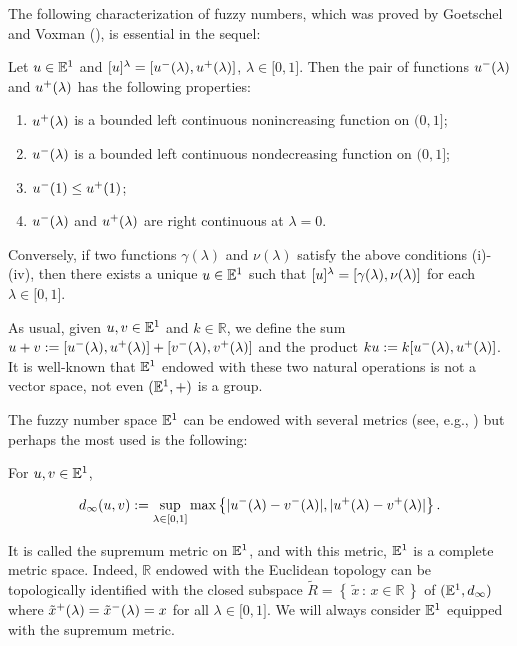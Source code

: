 \documentclass[12pt]{amsart}
\newcommand{\R}{{\mathbb{R}}}
\newcommand{\inter}{\mathopen [0,1\mathclose]}
\newcommand{\interu}{\mathopen [u\sp{-}(\lambda),
u\sp{+}(\lambda)\mathclose]}
\newcommand{\interv}{\mathopen [v\sp{-}(\lambda),
v\sp{+}(\lambda)\mathclose]}
\newcommand{\cj}[2]{\left \{\, #1\, : \, #2\, \right\}}
\newcommand{\n}{\noindent}
\newcommand{\fn}{\mathbb{E}\sp{1}}
\begin{document}
The following characterization of fuzzy numbers, which was proved by Goetschel and Voxman (\cite{GV}), is essential in the sequel:


\begin{theorem}\label{GW1}
Let $u\in\fn$ and $[u]\sp{\lambda}=\interu$, $\lambda\in\inter$.
Then the pair of functions $u\sp{-}(\lambda)$ and
$u\sp{+}(\lambda)$ has the following properties:

\begin{enumerate}
\item  $u\sp{+}(\lambda)$ is a bounded left continuous nonincreasing function
on $\mathopen (0,1\mathclose]$;

\item $u\sp{-}(\lambda)$ is a bounded left continuous nondecreasing function
on $\mathopen (0,1\mathclose]$;

\item $u\sp{-}(1)\leq u\sp{+}(1)$;

\item $u\sp{-}(\lambda)$ and $u\sp{+}(\lambda)$ are right continuous at
$\lambda=0$.
\end{enumerate}

\n Conversely, if two functions $\gamma (\lambda)$ and
$\nu(\lambda)$ satisfy the above conditions (i)-(iv), then there
exists a unique $u\in\fn$ such that
$[u]\sp{\lambda}=\mathopen[\gamma(\lambda),\nu(\lambda)\mathclose]$
for each $\lambda\in\inter$.
\end{theorem}

As usual, given $u,v\in \fn$ and $k\in \mathbb{R}$, we define the sum $u+v:=\interu+\interv$ and the product $ku:=k\interu$.
It is well-known that $\fn$ endowed with these two natural operations is not a vector space, not even $(\fn,+)$ is a group.

The fuzzy number space $\fn$ can be endowed with several metrics (see, e.g., \cite {DK2}) but perhaps the most used is the following:


\begin{definition}{\rm \cite{GV,DK2}}\label{GW2}
 For $u, v\in\fn$, 

$$
d\sb{\infty}(u,v):=\sup\sb{\lambda\in\inter}\max\left\{|u\sp{-}(\lambda)-v\sp{
- } (\lambda)|, |u\sp{+}(\lambda)-v\sp{+} (\lambda)|\right \}.
$$

\end{definition}

It is called the supremum
metric on $\fn$, and with this metric, $\fn$ is a complete metric
space. Indeed, $\R$ endowed with the Euclidean topology can be topologically identified
with the closed subspace $\tilde{R}=\cj{\tilde{x}}{x\in\R}$ of
$(\fn , d\sb{\infty})$ where
$\tilde{x}\sp{+}(\lambda)=\tilde{x}\sp{-}(\lambda)=x$ for all
$\lambda\in\mathopen[0,1\mathclose]$. We will always
consider $\fn$ equipped with the supremum metric.
\end{document}
